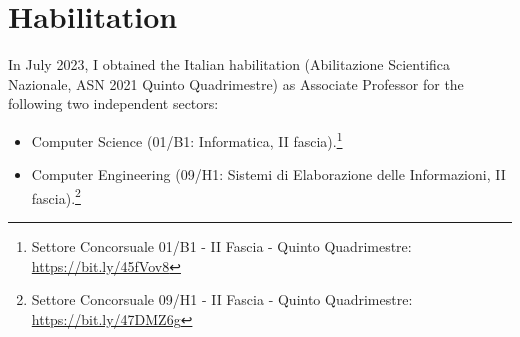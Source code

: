 \documentclass[a4paper,9pt]{article} %
\begin{document}
\section{Habilitation}

In July 2023, I obtained the Italian habilitation (Abilitazione Scientifica Nazionale, ASN 2021 Quinto Quadrimestre) as Associate Professor for the following two independent sectors:

\begin{itemize}
	\item Computer Science (01/B1: Informatica, II fascia).\footnote{Settore Concorsuale 01/B1 - II Fascia - Quinto Quadrimestre: \url{https://bit.ly/45fVov8}}
	\item Computer Engineering (09/H1: Sistemi di Elaborazione delle Informazioni, II fascia).\footnote{Settore Concorsuale 09/H1 - II Fascia - Quinto Quadrimestre: \url{https://bit.ly/47DMZ6g}}
\end{itemize}
\end{document}
